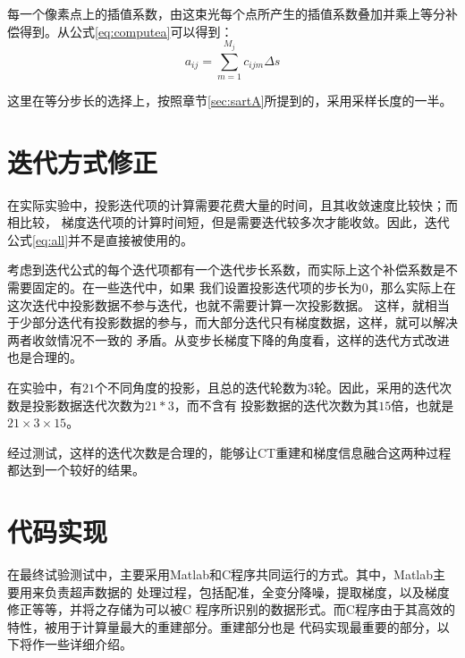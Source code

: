 每一个像素点上的插值系数，由这束光每个点所产生的插值系数叠加并乘上等分补偿得到。从公式\eqref{eq:computea}可以得到：
\begin{equation}\label{eq:computed}
a_{ij}=\sum^{M_j}_{m=1}c_{ijm}\Delta s
\end{equation}

这里在等分步长的选择上，按照章节\ref{sec:sartA}所提到的，采用采样长度的一半。

\section{迭代方式修正}
在实际实验中，投影迭代项的计算需要花费大量的时间，且其收敛速度比较快；而相比较，
梯度迭代项的计算时间短，但是需要迭代较多次才能收敛。因此，迭代公式\eqref{eq:all}并不是直接被使用的。

考虑到迭代公式的每个迭代项都有一个迭代步长系数，而实际上这个补偿系数是不需要固定的。在一些迭代中，如果
我们设置投影迭代项的步长为$0$，那么实际上在这次迭代中投影数据不参与迭代，也就不需要计算一次投影数据。
这样，就相当于少部分迭代有投影数据的参与，而大部分迭代只有梯度数据，这样，就可以解决两者收敛情况不一致的
矛盾。从变步长梯度下降的角度看，这样的迭代方式改进也是合理的。

在实验中，有$21$个不同角度的投影，且总的迭代轮数为$3$轮。因此，采用的迭代次数是投影数据迭代次数为$21*3$，而不含有
投影数据的迭代次数为其$15$倍，也就是$21 \times 3 \times 15$。

经过测试，这样的迭代次数是合理的，能够让CT重建和梯度信息融合这两种过程都达到一个较好的结果。

\section{代码实现}
在最终试验测试中，主要采用Matlab和C程序共同运行的方式。其中，Matlab主要用来负责超声数据的
处理过程，包括配准，全变分降噪，提取梯度，以及梯度修正等等，并将之存储为可以被C
程序所识别的数据形式。而C程序由于其高效的特性，被用于计算量最大的重建部分。重建部分也是
代码实现最重要的部分，以下将作一些详细介绍。

